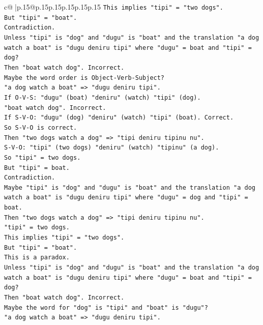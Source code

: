 \documentclass{article}
\begin{document}
{\begin{supertabular}{c@{$\;$}|p{.15\linewidth}@{}p{.15\linewidth}p{.15\linewidth}p{.15\linewidth}p{.15\linewidth}p{.15\linewidth}}
{{{\texttt{This implies "tipi" = "two dogs".} \\
\texttt{But "tipi" = "boat".} \\
\texttt{Contradiction.} \\
\texttt{Unless "tipi" is "dog" and "dugu" is "boat" and the translation "a dog watch a boat" is "dugu deniru tipi" where "dugu" = boat and "tipi" = dog?} \\
\texttt{Then "boat watch dog". Incorrect.} \\
\texttt{Maybe the word order is Object{-}Verb{-}Subject?} \\
\texttt{"a dog watch a boat" => "dugu deniru tipi".} \\
\texttt{If O{-}V{-}S: "dugu" (boat) "deniru" (watch) "tipi" (dog).} \\
\texttt{"boat watch dog". Incorrect.} \\
\texttt{If S{-}V{-}O: "dugu" (dog) "deniru" (watch) "tipi" (boat). Correct.} \\
\texttt{So S{-}V{-}O is correct.} \\
\texttt{Then "two dogs watch a dog" => "tipi deniru tipinu nu".} \\
\texttt{S{-}V{-}O: "tipi" (two dogs) "deniru" (watch) "tipinu" (a dog).} \\
\texttt{So "tipi" = two dogs.} \\
\texttt{But "tipi" = boat.} \\
\texttt{Contradiction.} \\
\texttt{Maybe "tipi" is "dog" and "dugu" is "boat" and the translation "a dog watch a boat" is "dugu deniru tipi" where "dugu" = dog and "tipi" = boat.} \\
\texttt{Then "two dogs watch a dog" => "tipi deniru tipinu nu".} \\
\texttt{"tipi" = two dogs.} \\
\texttt{This implies "tipi" = "two dogs".} \\
\texttt{But "tipi" = "boat".} \\
\texttt{This is a paradox.} \\
\texttt{Unless "tipi" is "dog" and "dugu" is "boat" and the translation "a dog watch a boat" is "dugu deniru tipi" where "dugu" = boat and "tipi" = dog?} \\
\texttt{Then "boat watch dog". Incorrect.} \\
\texttt{Maybe the word for "dog" is "tipi" and "boat" is "dugu"?} \\
\texttt{"a dog watch a boat" => "dugu deniru tipi".} \\
}}}
\end{supertabular}}
\end{document}
